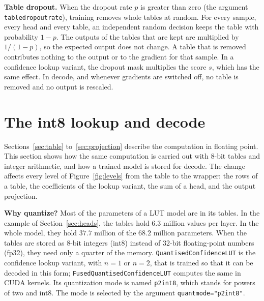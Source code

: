 \documentclass[11pt]{article}
\DeclareRobustCommand{\code}[1]{{\renewcommand{\_}{\textunderscore\allowbreak}\texttt{#1}}}
\begin{document}
\textbf{Table dropout.} When the dropout rate $p$ is greater than zero (the argument
\code{table\_dropout\_rate}), training removes whole tables at random. For every sample, every head and
every table, an independent random decision keeps the table with probability $1-p$. The outputs of the
tables that are kept are multiplied by $1/(1-p)$, so the expected output does not change. A table that is
removed contributes nothing to the output or to the gradient for that sample. In a confidence lookup
variant, the dropout mask multiplies the score $s$, which has the same effect. In decode, and whenever gradients are
switched off, no table is removed and no output is rescaled.

\section{The int8 lookup and decode}
\label{sec:quant}

Sections~\ref{sec:table} to~\ref{sec:projection} describe the computation in floating point. This section
shows how the same computation is carried out with 8-bit tables and integer arithmetic, and how a trained
model is stored for decode. The change affects every level of Figure~\ref{fig:levels} from the table to
the wrapper: the rows of a table, the coefficients of the lookup variant, the sum of a head, and the output
projection.

\textbf{Why quantize?} Most of the parameters of a LUT model are in its tables. In the example of
Section~\ref{sec:heads}, the tables hold $6.3$ million values per layer. In the whole model, they hold
$37.7$ million of the $68.2$ million parameters. When the tables are stored as 8-bit integers (int8)
instead of 32-bit floating-point numbers (fp32), they need only a quarter of the memory.
\code{QuantisedConfidenceLUT} is the confidence lookup variant, with $n=1$ or $n=2$, that is trained so
that it can be decoded in this form; \code{FusedQuantisedConfidenceLUT} computes the same in CUDA
kernels. Its quantization mode is named \code{p2\_int8}, which stands for powers of two and
int8. The mode is selected by the argument \mbox{\code{quant\_mode="p2\_int8"}}.
\end{document}
